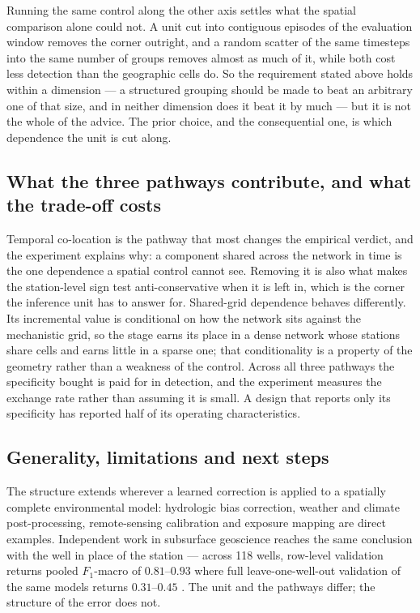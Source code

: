 Running the same control along the other axis settles what the spatial comparison alone could not.
A unit cut into contiguous episodes of the evaluation window removes the corner outright, and a
random scatter of the same timesteps into the same number of groups removes almost as much of it,
while both cost less detection than the geographic cells do. So the requirement stated above holds
within a dimension --- a structured grouping should be made to beat an arbitrary one of that size,
and in neither dimension does it beat it by much --- but it is not the whole of the advice. The
prior choice, and the consequential one, is which dependence the unit is cut along.




\subsection{What the three pathways contribute, and what the trade-off costs}

Temporal co-location is the pathway that most changes the empirical verdict, and the experiment
explains why: a component shared across the network in time is the one dependence a spatial
control cannot see. Removing it is also what makes the station-level sign test anti-conservative
when it is left in, which is the corner the inference unit has to answer for. Shared-grid
dependence behaves differently. Its incremental value is conditional on how the network sits
against the mechanistic grid, so the stage earns its place in a dense network whose stations share
cells and earns little in a sparse one; that conditionality is a property of the geometry rather
than a weakness of the control. Across all three pathways the specificity bought is paid for in
detection, and the experiment measures the exchange rate rather than assuming it is small. A
design that reports only its specificity has reported half of its operating characteristics.

\subsection{Generality, limitations and next steps}

The structure extends wherever a learned correction is applied to a spatially complete
environmental model: hydrologic bias correction, weather and climate post-processing,
remote-sensing calibration and exposure mapping are direct examples. Independent work in subsurface
geoscience reaches the same conclusion with the well in place of the station --- across 118 wells,
row-level validation returns pooled $F_1$-macro of $0.81$--$0.93$ where full leave-one-well-out
validation of the same models returns $0.31$--$0.45$ \citep{yue2026validation}. The unit and the
pathways differ; the structure of the error does not.

